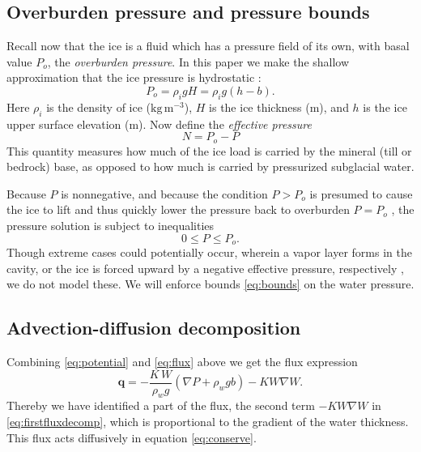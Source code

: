 \documentclass[11pt,final]{amsart}%
\newcommand\bq{\mathbf{q}}
\newcommand{\grad}{\nabla}
\begin{document}
\subsection*{Overburden pressure and pressure bounds}  Recall now that the ice is a fluid which has a pressure field of its own, with basal value $P_o$, the \emph{overburden pressure}.  In this paper we make the shallow approximation that the ice pressure is hydrostatic \citep{GreveBlatter2009}:
\begin{equation} \label{eq:hydrostatic}
  P_o = \rho_i g H = \rho_i g (h-b).
\end{equation}
Here $\rho_i$ is the density of ice ($\text{kg}\,\text{m}^{-3}$), $H$ is the ice thickness (m), and $h$ is the ice upper surface elevation (m).  Now define the \emph{effective pressure}
\begin{equation}
N = P_o - P\label{eq:effective}
\end{equation}
This quantity measures how much of the ice load is carried by the mineral (till or bedrock) base, as opposed to how much is carried by pressurized subglacial water.

Because $P$ is nonnegative, and because the condition $P>P_o$ is presumed to cause the ice to lift and thus quickly lower the pressure back to overburden $P=P_o$ \citep{Schoofetal2012}, the pressure solution is subject to inequalities
\begin{equation}
0 \le P \le P_o. \label{eq:bounds}
\end{equation}
Though extreme cases could potentially occur, wherein a vapor layer forms in the cavity, or the ice is forced upward by a negative effective pressure, respectively \citep{Schoofetal2012}, we do not model these.  We will enforce bounds \eqref{eq:bounds} on the water pressure.


\subsection*{Advection-diffusion decomposition}  Combining \eqref{eq:potential} and \eqref{eq:flux} above we get the flux expression
\begin{equation}
  \bq = - \frac{K\, W}{\rho_w g} \left(\grad P + \rho_w g b\right) - K W \grad W. \label{eq:firstfluxdecomp}
\end{equation}
Thereby we have identified a part of the flux, the second term $-K W \grad W$ in \eqref{eq:firstfluxdecomp}, which is proportional to the gradient of the water thickness.  This flux acts diffusively in equation \eqref{eq:conserve}.
\end{document}
